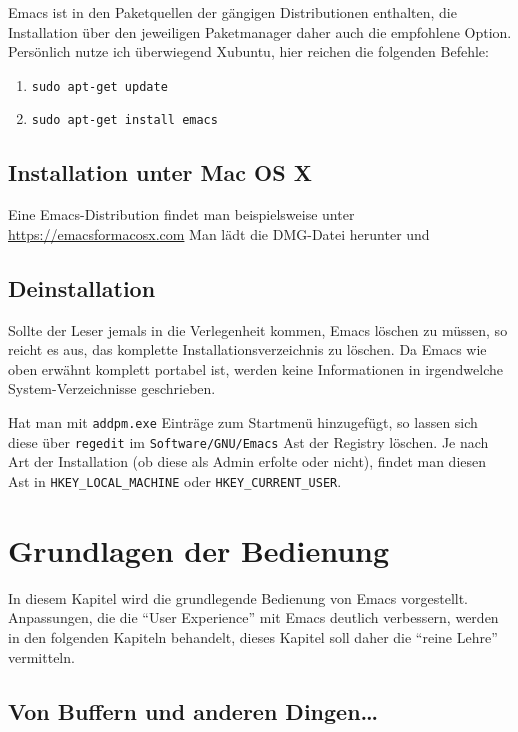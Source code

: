 \documentclass[12pt,ngerman]{scrbook}
\begin{document}
Emacs ist in den Paketquellen der gängigen Distributionen enthalten, die Installation über den jeweiligen Paketmanager daher auch die empfohlene Option. Persönlich nutze ich überwiegend Xubuntu, hier reichen die folgenden Befehle:

\begin{enumerate}
\item \texttt{sudo apt-get update}
\item \texttt{sudo apt-get install emacs}
\end{enumerate}

\section{Installation unter Mac OS X}

Eine Emacs-Distribution findet man beispielsweise unter \url{https://emacsformacosx.com}
Man lädt die DMG-Datei herunter und 


\section{Deinstallation}

Sollte der Leser jemals in die Verlegenheit kommen, Emacs löschen zu müssen, so reicht es aus, das komplette Installationsverzeichnis zu löschen. Da Emacs wie oben erwähnt komplett portabel ist, werden keine Informationen in irgendwelche System-Verzeichnisse geschrieben.

Hat man mit \texttt{addpm.exe} Einträge zum Startmenü hinzugefügt, so lassen sich diese über \texttt{regedit} im \texttt{Software/GNU/Emacs} Ast der Registry löschen. 
Je nach Art der Installation (ob diese als Admin erfolte oder nicht), findet man diesen Ast in \verb|HKEY_LOCAL_MACHINE| oder \verb|HKEY_CURRENT_USER|.


\chapter{Grundlagen der Bedienung}

In diesem Kapitel wird die grundlegende Bedienung von Emacs vorgestellt. 
Anpassungen, die die \enquote{User Experience} mit Emacs deutlich verbessern, werden in den folgenden Kapiteln behandelt, dieses Kapitel soll daher die \enquote{reine Lehre} vermitteln.

\section{Von Buffern und anderen Dingen\ldots}
\end{document}
